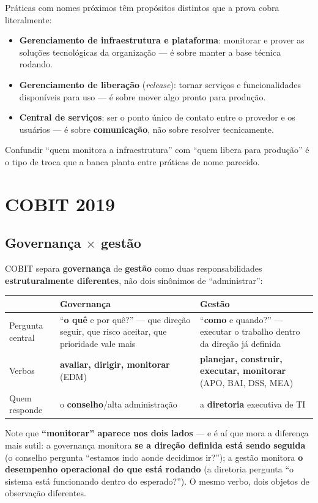 \begin{cuidado}
Práticas com nomes próximos têm propósitos distintos que a prova cobra
literalmente:
\begin{itemize}
\item \textbf{Gerenciamento de infraestrutura e plataforma}: monitorar e
prover as soluções tecnológicas da organização --- é sobre manter a base
técnica rodando.
\item \textbf{Gerenciamento de liberação} (\textit{release}): tornar
serviços e funcionalidades disponíveis para uso --- é sobre mover algo
pronto para produção.
\item \textbf{Central de serviços}: ser o ponto único de contato entre o
provedor e os usuários --- é sobre \textbf{comunicação}, não sobre resolver
tecnicamente.
\end{itemize}
Confundir “quem monitora a infraestrutura” com “quem libera para produção”
é o tipo de troca que a banca planta entre práticas de nome parecido.
\end{cuidado}

\section{COBIT 2019}
\label{sec:cobit-teoria}

\subsection{Governança $\times$ gestão}

\begin{conceito}
COBIT separa \textbf{governança} de \textbf{gestão} como duas
responsabilidades \textbf{estruturalmente diferentes}, não dois sinônimos
de “administrar”:

\begin{center}
\begin{tabular}{@{}p{2.4cm}p{4.3cm}p{4.6cm}@{}}
\toprule
& \textbf{Governança} & \textbf{Gestão} \\
\midrule
Pergunta central & “\textbf{o quê} e por quê?” --- que direção seguir, que
risco aceitar, que prioridade vale mais & “\textbf{como} e quando?” ---
executar o trabalho dentro da direção já definida \\
Verbos & \textbf{avaliar, dirigir, monitorar} (EDM) & \textbf{planejar,
construir, executar, monitorar} (APO, BAI, DSS, MEA) \\
Quem responde & o \textbf{conselho}/alta administração & a
\textbf{diretoria} executiva de TI \\
\bottomrule
\end{tabular}
\end{center}

Note que \textbf{“monitorar” aparece nos dois lados} --- e é aí que mora a
diferença mais sutil: a governança monitora \textbf{se a direção definida
está sendo seguida} (o conselho pergunta “estamos indo aonde decidimos
ir?”); a gestão monitora \textbf{o desempenho operacional do que está
rodando} (a diretoria pergunta “o sistema está funcionando dentro do
esperado?”). O mesmo verbo, dois objetos de observação diferentes.
\end{conceito}

